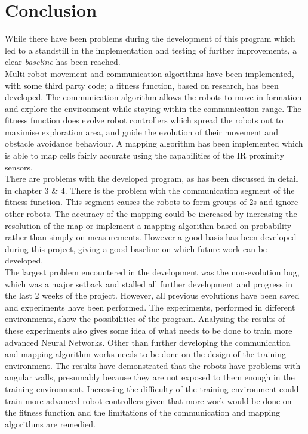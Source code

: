 \section{Conclusion}
While there have been problems during the development of this program which led to a standstill in the implementation and testing of further improvements, a clear \textit{baseline} has been reached.\\

Multi robot movement and communication algorithms have been implemented, with some third party code; a fitness function, based on research, has been developed.
The communication algorithm allows the robots to move in formation and explore the environment while staying within the communication range. 
The fitness function does evolve robot controllers which spread the robots out to maximise exploration area, and guide the evolution of their movement and obstacle avoidance behaviour. 
A mapping algorithm has been implemented which is able to map cells fairly accurate using the capabilities of the IR proximity sensors.\\

There are problems with the developed program, as has been discussed in detail in chapter 3 \& 4. There is the problem with the communication segment of the fitness function. This segment causes the robots to form groups of 2s and ignore other robots. The accuracy of the mapping could be increased by increasing the resolution of the map or implement a mapping algorithm based on probability rather than simply on measurements. 
However a good basis has been developed during this project, giving a good baseline on which future work can be developed.\\

The largest problem encountered in the development was the non-evolution bug, which was a major setback and stalled all further development and progress in the last 2 weeks of the project.
However, all previous evolutions have been saved and experiments have been performed. 
The experiments, performed in different environments, show the possibilities of the program. Analysing the results of these experiments also gives some idea of what needs to be done to train more advanced Neural Networks. 
Other than further developing the communication and mapping algorithm works needs to be done on the design of the training environment. 
The results have demonstrated that the robots have problems with angular walls, presumably because they are not exposed to them enough in the training environment.
Increasing the difficulty of the training environment could train more advanced robot controllers given that more work would be done on the fitness function and the limitations of the communication and mapping algorithms are remedied.\\

